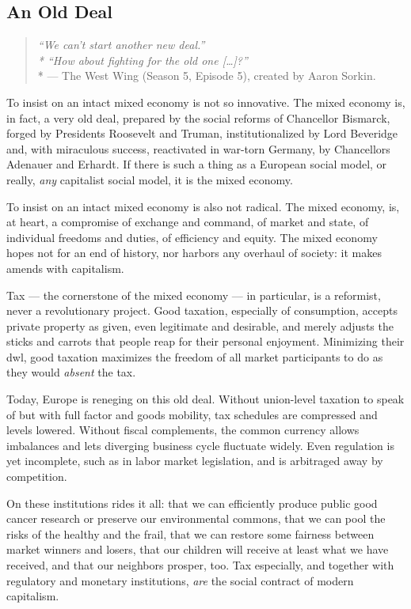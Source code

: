 \subsection[An Old Deal]{An Old Deal}

\begin{quote}
	\emph{``We can't start another new deal.''
	\\*
	``How about fighting for the old one [\ldots]?''}
	\\*
	--- The West Wing (Season 5, Episode 5), created by Aaron Sorkin.
\end{quote}

To insist on an intact mixed economy is not so innovative.
The mixed economy is, in fact, a very old deal, prepared by the social reforms of Chancellor Bismarck, forged by Presidents Roosevelt and Truman, institutionalized by Lord Beveridge and, with miraculous success, reactivated in war-torn Germany, by Chancellors Adenauer and Erhardt.
If there is such a thing as a European social model, or really, \emph{any} capitalist social model, it is the mixed economy.

To insist on an intact mixed economy is also not radical.
The mixed economy, is, at heart, a compromise of exchange and command, of market and state, of individual freedoms and duties, of efficiency and equity.
The mixed economy hopes not for an end of history, nor harbors any overhaul of society:
it makes amends with capitalism.

Tax --- the cornerstone of the mixed economy --- in particular, is a reformist, never a revolutionary project.
Good taxation, especially of consumption, accepts private property as given, even legitimate and desirable, and merely adjusts the sticks and carrots that people reap for their personal enjoyment.
Minimizing their \gls{dwl}, good taxation maximizes the freedom of all market participants to do as they would \emph{absent} the tax.

Today, Europe is reneging on this old deal.
Without union-level taxation to speak of but with full factor and goods mobility, tax schedules are compressed and levels lowered.
Without fiscal complements, the common currency allows imbalances and lets diverging business cycle fluctuate widely.
Even regulation is yet incomplete, such as in labor market legislation, and is arbitraged away by competition.

On these institutions rides it all:
that we can efficiently produce public good cancer research or preserve our environmental commons, that we can pool the risks of the healthy and the frail, that we can restore some fairness between market winners and losers, that our children will receive at least what we have received, and that our neighbors prosper, too.
Tax especially, and together with regulatory and monetary institutions, \emph{are} the social contract of modern capitalism.

